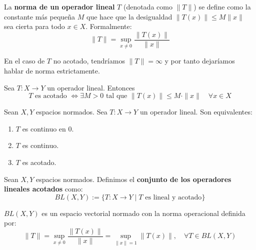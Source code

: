 \documentclass[12pt]{book}
\newcommand{\tbf}{\textbf}
\begin{document}
\begin{definicion}
    La \tbf{norma de un operador lineal} $T$ (denotada como $\|T\|$) se define como la constante más pequeña $M$ que hace que la desigualdad $\|T(x)\| \leq M \|x\|$ sea cierta para todo $x\in X$. Formalmente:
    $$\|T\| = \sup_{x \neq 0} \frac{\|T(x)\|}{\|x\|}$$
\end{definicion}
\begin{observacion}
    En el caso de $T$ no acotado, tendríamos $\|T\|=\infty$ y por tanto dejaríamos hablar de norma estrictamente.
\end{observacion}


\begin{prop}
    Sea $T: X \longrightarrow Y$ un operador lineal. Entonces 
    \begin{equation*}
        T \text{ es acotado } \iff \exists M > 0 \text{ tal que } \|T(x)\| \leq M \cdot \|x\| \quad \forall x \in X
    \end{equation*}
\end{prop}


\begin{prop}\label{prop:continuidad-acotado}
    Sean $X, Y$ espacios normados. Sea $T: X \longrightarrow Y$ un operador lineal. Son equivalentes:
    \begin{enumerate}
        \item[i)] $T$ es continuo en $0$.
        \item[ii)] $T$ es continuo.
        \item[iii)] $T$ es acotado.
    \end{enumerate}
\end{prop}

\begin{definicion}
    Sean $X, Y$ espacios normados. Definimos el \tbf{conjunto de los operadores lineales acotados} como:
    \begin{equation*}
        BL(X, Y) := \{ T: X \longrightarrow Y \mid T \text{ es lineal y acotado} \}
    \end{equation*}
\end{definicion}

\begin{prop}\label{prop:norma-operacional}
    $BL(X, Y)$ es un espacio vectorial normado con la norma operacional definida por:
    \begin{equation*}
        \|T\| = \sup_{x \neq 0} \frac{\|T(x)\|}{\|x\|} = \sup_{\|x\|=1} \|T(x)\|, \quad \forall T \in BL(X, Y)
    \end{equation*}
\end{prop}
\end{document}
